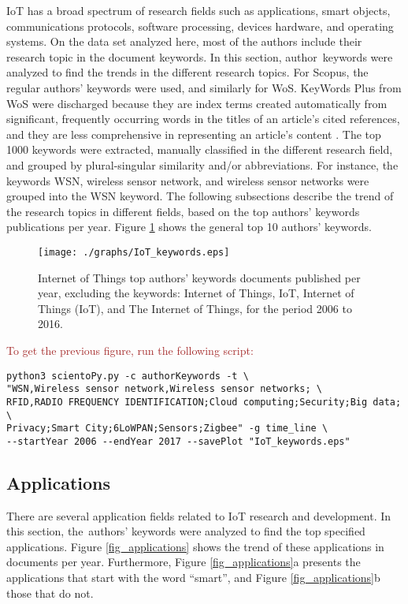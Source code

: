 \documentclass[symmetry,article,accept,moreauthors,pdftex10pt,a4paper]{mdpi}
\newcommand{\figuresWidth}{0.65\textwidth}
\begin{document}
IoT has a broad spectrum of research fields such as applications, smart objects, communications protocols, software processing, devices hardware, and operating systems. On the data set analyzed here, most of the authors include their research topic in the document keywords. In this section, author~keywords were analyzed to find the trends in the different research topics. For Scopus, the regular authors' keywords were used, and similarly for WoS. KeyWords Plus from WoS were discharged because they are index terms created automatically from significant, frequently occurring words in the titles of an article's cited references, and they are less comprehensive in representing an article's content \cite{zhang2016comparing}. The top 1000 keywords were extracted, manually classified in the different research field, and grouped by plural-singular similarity and/or abbreviations. For instance, the keywords WSN, wireless sensor network, and wireless sensor networks were grouped into the WSN keyword. The following subsections describe the trend of the research topics in different fields, based on the top authors' keywords publications per year. Figure \ref{fig_keywords} shows the general top 10 authors' keywords.

\begin{figure}[H]
	\centering
	\texttt{[image: ./graphs/IoT\_keywords.eps]}
	\caption{Internet of Things top authors' keywords documents published per year, excluding the keywords: Internet of Things, IoT, Internet of Things (IoT), and The Internet of Things, for the period 2006 to 2016.}
	\label{fig_keywords}
\end{figure} 

\noindent
\textcolor{brown}{To get the previous figure, run the following script:}\\
\begin{verbatim}
python3 scientoPy.py -c authorKeywords -t \
"WSN,Wireless sensor network,Wireless sensor networks; \
RFID,RADIO FREQUENCY IDENTIFICATION;Cloud computing;Security;Big data; \
Privacy;Smart City;6LoWPAN;Sensors;Zigbee" -g time_line \
--startYear 2006 --endYear 2017 --savePlot "IoT_keywords.eps"
\end{verbatim}

  
\subsection{Applications}

There are several application fields related to IoT research and development. In this section, the~authors' keywords were analyzed to find the top specified applications. Figure \ref{fig_applications} shows the trend of these applications in documents per year. Furthermore, Figure \ref{fig_applications}a presents the applications that start with the word ``smart'', and Figure \ref{fig_applications}b those that do not.
\end{document}
